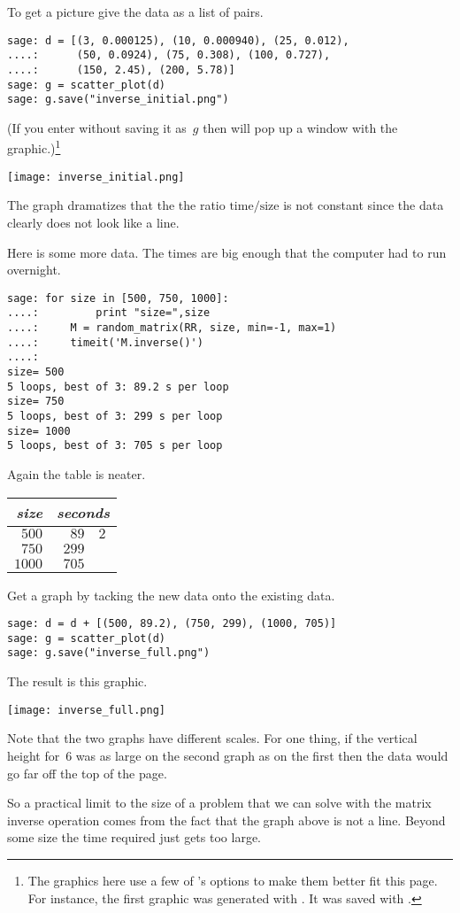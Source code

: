 To get a picture give \Sage{} the data as a list of pairs.
\begin{lstlisting}
sage: d = [(3, 0.000125), (10, 0.000940), (25, 0.012),  
....:      (50, 0.0924), (75, 0.308), (100, 0.727), 
....:      (150, 2.45), (200, 5.78)]
sage: g = scatter_plot(d)
sage: g.save("inverse_initial.png")            
\end{lstlisting}
(If you enter  without saving
it as~$g$ then \Sage{} will pop up a window with the
graphic.)\footnote{The graphics here use a few of \protect\Sage's options
to make them better fit this page.
For instance, the first graphic was generated with \protect{}.
It was saved with \protect{}.}
\begin{center}
  \texttt{[image: inverse\_initial.png]}
\end{center}
The graph dramatizes that the the ratio $\text{time}/\text{size}$
is not constant
since the data clearly does not look like a line.

Here is some more data.
The times are big enough that the computer had to run overnight.
\begin{lstlisting}
sage: for size in [500, 750, 1000]:                             
....:         print "size=",size
....:     M = random_matrix(RR, size, min=-1, max=1)
....:     timeit('M.inverse()')
....: 
size= 500
5 loops, best of 3: 89.2 s per loop
size= 750
5 loops, best of 3: 299 s per loop
size= 1000
5 loops, best of 3: 705 s per loop
\end{lstlisting}
Again the table is neater.
\begin{center}
  \begin{tabular}{r|r@{.}l}
    \textit{size}     &\multicolumn{2}{c}{\textit{seconds}}  \\  \hline
    $500$       &$89$ &$2$ \\
    $750$       &$299$ &   \\
    $1000$      &$705$ &   
  \end{tabular}
\end{center}
Get a graph by tacking the new data onto the existing data.
\begin{lstlisting}
sage: d = d + [(500, 89.2), (750, 299), (1000, 705)]
sage: g = scatter_plot(d)                           
sage: g.save("inverse_full.png")                      
\end{lstlisting}
The result is this graphic.
\begin{center}
  \texttt{[image: inverse\_full.png]}
\end{center}
Note that the two graphs have different scales.
For one thing, 
if the vertical height for~$6$ was as large on the second graph as 
on the first then the data would go far off the top of the page.

So a practical limit to the size of a problem that we can solve with
the matrix inverse operation comes from the fact that the graph above is
not a line.
Beyond some size the time required just gets too large. 

\endinput


TODO:
